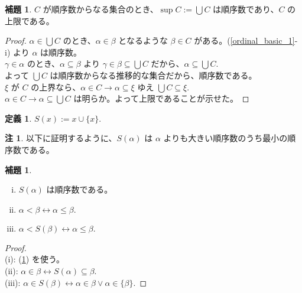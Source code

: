 \documentclass{jsarticle}
\theoremstyle{definition}
\newtheorem*{definition*}{定義}
\newtheorem{lemma}[theorem]{補題}
\newtheorem{remark}{注}[section]
\begin{document}
    \begin{lemma} \label{ordinal_basic_4} $C$ が順序数からなる集合のとき、$\sup C := \bigcup C$ は順序数であり、$C$ の上限である。
    \end{lemma}
    \begin{proof}
        $\alpha \in \bigcup C$ のとき、$\alpha \in \beta$ となるような $\beta \in C$ がある。(\ref{ordinal_basic_1}-i) より $\alpha$ は順序数。\\
        $\gamma \in \alpha$ のとき、$\alpha \subseteq \beta$ より $\gamma \in \beta \subseteq \bigcup C$ だから、$\alpha \subseteq \bigcup C.$\\
        よって $\bigcup C$ は順序数からなる推移的な集合だから、順序数である。\\
        $\xi$ が $C$ の上界なら、$\alpha \in C \rightarrow \alpha \subseteq \xi$ ゆえ $\bigcup C \subseteq \xi.$ \\
        $\alpha \in C \rightarrow \alpha \subseteq \bigcup C$ は明らか。よって上限であることが示せた。 
    \end{proof}
    \vspace{1ex}
    
    \begin{definition*} \label{successor} $S(x) := x \cup \{x\}.$
    \end{definition*}
    \begin{remark}
        以下に証明するように、$S(\alpha)$ は $\alpha$ よりも大きい順序数のうち最小の順序数である。
    \end{remark}
    
    \begin{lemma} \label{ordinal_basic_5} \
        \begin{enumerate}[(i)]
            \item $S(\alpha)$ は順序数である。
            \item $\alpha < \beta \leftrightarrow \alpha \leq \beta.$
            \item $\alpha < S(\beta) \leftrightarrow \alpha \leq \beta.$
        \end{enumerate} 
    \end{lemma}
    \begin{proof} \ \\
        (i): (\ref{ordinal_basic_4}) を使う。\\
        (ii): $\alpha \in \beta \leftrightarrow S(\alpha) \subseteq \beta.$\\
        (iii): $\alpha \in S(\beta) \leftrightarrow \alpha \in \beta \lor \alpha \in \{\beta\}.$
    \end{proof}
    \vspace{0.5ex}
    
\end{document}
